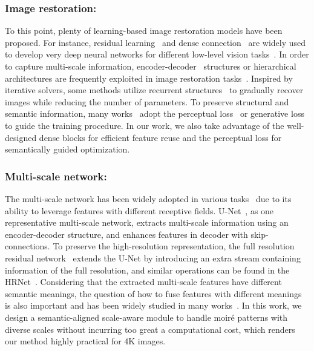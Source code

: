 \documentclass[runningheads]{llncs}
\begin{document}
\subsubsection{Image restoration:} To this point, plenty of learning-based image restoration models have been proposed. For instance, residual learning~\cite{he2016deep} and dense connection~\cite{huang2017densely} are widely used to develop very deep neural networks for different low-level vision tasks~\cite{zhang2017beyond,anwar2020densely,lim2017enhanced,kim2016accurate,zhang2018residual}. In order to capture multi-scale information, encoder-decoder~\cite{ronneberger2015u} structures or hierarchical architectures are frequently exploited in image restoration tasks~\cite{zhang2019deep,zamir2021multi,gao2019dynamic}. Inspired by iterative solvers, some methods utilize recurrent structures~\cite{gao2019dynamic,tao2018scale} to gradually recover images while reducing the number of parameters. 
To preserve structural and semantic information, 
many works~\cite{xie2019image,liu2018image,song2018contextual,yang2017high,suvorov2021resolution,wang2020vcnet} adopt the perceptual loss~\cite{johnson2016perceptual} or generative loss~\cite{goodfellow2014generative,gulrajani2017improved,arjovsky2017wasserstein} to guide the training procedure. 
In our work, we also take advantage of the well-designed dense blocks for efficient feature reuse and the perceptual loss for semantically guided optimization. 
  

\subsubsection{Multi-scale network:} The multi-scale network has been widely adopted in various tasks~\cite{wang2020deep,chen2018learning,zhou2018stereo,yeh2016semantic,chen2017photographic} due to its ability to leverage features with different receptive fields. U-Net~\cite{ronneberger2015u}, as one representative multi-scale network, extracts multi-scale information using an encoder-decoder structure, and enhances features in decoder with skip-connections. To preserve the high-resolution representation, the full resolution residual network~\cite{pohlen2017full} extends the U-Net by introducing an extra stream containing information of the full resolution, and similar operations can be found in the HRNet~\cite{wang2020deep}. Considering that the extracted multi-scale features have different semantic meanings, the question of how to fuse features with different meanings is also important and has been widely studied in many works~\cite{cai2016unified,chen2017deeplab,chen2018cascaded}. In this work, we design a semantic-aligned scale-aware module to handle moiré patterns with diverse scales without incurring too great a computational cost, which renders our method highly practical for 4K images.
\end{document}

